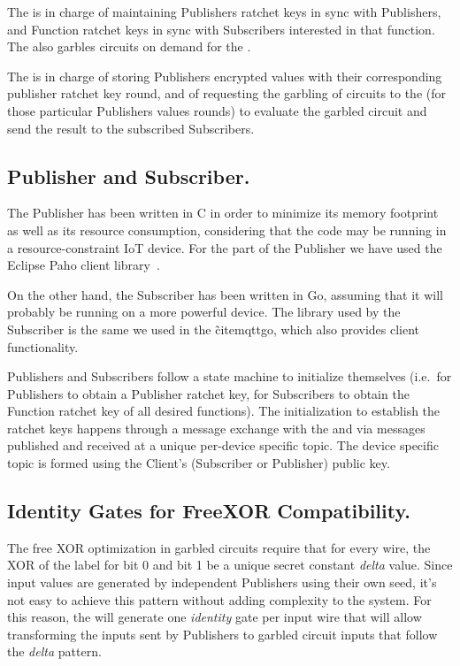 The \garbler is in charge of maintaining Publishers ratchet keys in sync
with Publishers, and Function ratchet keys in sync with Subscribers interested
in that function.  The \garbler also garbles circuits on demand for the
\broker.

The \broker is in charge of storing Publishers encrypted values with their
corresponding publisher ratchet key round, and of requesting the garbling of
circuits to the \garbler (for those particular Publishers values rounds) to
evaluate the garbled circuit and send the result to the subscribed Subscribers.

\subsection{Publisher and Subscriber.}

The Publisher has been written in C in order to minimize its memory footprint
as well as its resource consumption, considering that the code may be running
in a resource-constraint IoT device.  For the \MQTT{} part of the Publisher we
have used the Eclipse Paho client library~\cite{paho}.

On the other hand, the Subscriber has been written in Go, assuming that it
will probably be running on a more powerful device.  The \MQTT{} library used
by the Subscriber is the same we used in the \broker\~cite{mqttgo}, which also
provides client functionality.

Publishers and Subscribers follow a state machine to initialize themselves
(i.e.\ for Publishers to obtain a Publisher ratchet key, for Subscribers to
obtain the Function ratchet key of all desired functions).  The initialization
to establish the ratchet keys happens through a message exchange with the
\broker and \garbler via \MQTT{} messages published and received at a unique
per-device specific topic.  The device specific topic is formed using the
Client's (Subscriber or Publisher) public key.

\subsection{Identity Gates for FreeXOR Compatibility.}

The free XOR optimization in garbled circuits require that for every wire, the
XOR of the label for bit 0 and bit 1 be a unique secret constant \emph{delta}
value.  Since input values are generated by independent Publishers using their
own seed, it's not easy to achieve this pattern without adding complexity to
the system.  For this reason, the \garbler will generate one \emph{identity}
gate per input wire that will allow transforming the inputs sent by Publishers
to garbled circuit inputs that follow the \emph{delta} pattern.

